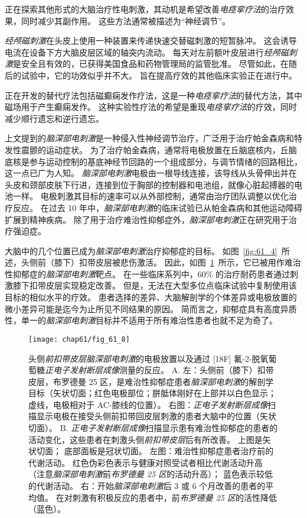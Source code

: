 正在探索其他形式的大脑治疗性电刺激，其动机是希望改善\textit{电痉挛疗法}的治疗效果，同时减少其副作用。
这些方法通常被描述为“神经调节”。


\textit{经颅磁刺激}在头皮上使用一种装置来传递快速交替磁刺激的短暂脉冲。
这会诱导电流在设备下方大脑皮层区域的轴突内流动。
每天对左前额叶皮层进行\textit{经颅磁刺激}是安全且有效的，已获得美国食品和药物管理局的监管批准。
尽管如此，在随后的试验中，它的功效似乎并不大。
旨在提高疗效的其他临床实验正在进行中。


正在开发的替代疗法包括磁癫痫发作疗法，这是一种\textit{电痉挛疗法}的替代方法，其中磁场用于产生癫痫发作。
这种实验性疗法的希望是重现\textit{电痉挛疗法}的疗效，同时减少顺行遗忘和逆行遗忘。


上文提到的\textit{脑深部电刺激}是一种侵入性神经调节治疗，广泛用于治疗帕金森病和特发性震颤的运动症状。
为了治疗帕金森病，通常将电极放置在丘脑底核内，丘脑底核是参与运动控制的基底神经节回路的一个组成部分，与调节情绪的回路相比，这一点已广为人知。
\textit{脑深部电刺激}电极由一根导线连接，该导线从头骨伸出并在头皮和颈部皮肤下行进，连接到位于胸部的控制器和电池组，就像心脏起搏器的电池一样。
电极刺激其目标的速率可以从外部控制，通常由治疗团队调整以优化治疗反应。
在过去 10 年中，\textit{脑深部电刺激}的临床试验已从帕金森病和其他运动障碍扩展到精神疾病。
除了用于治疗难治性抑郁症外，\textit{脑深部电刺激}正在研究用于治疗强迫症。


大脑中的几个位置已成为\textit{脑深部电刺激}治疗抑郁症的目标。
如图~\ref{fig:61_4}~所述，头侧前（膝下）扣带皮层被悲伤激活。
因此，如图~\ref{fig:61_8}~所示，它已被用作难治性抑郁症的\textit{脑深部电刺激}靶点。
在一些临床系列中，60\% 的治疗耐药患者通过刺激膝下扣带皮层实现稳定改善。
但是，无法在大型多位点临床试验中复制使用该目标的相似水平的疗效。
患者选择的差异、大脑解剖学的个体差异或电极放置的微小差异可能是迄今为止所见不同结果的原因。
简而言之，抑郁症具有高度异质性，单一的\textit{脑深部电刺激}目标并不适用于所有难治性患者也就不足为奇了。


\begin{figure}[htbp]
	\centering
	\texttt{[image: chap61/fig\_61\_8]}
	\caption{头侧\textit{前扣带皮层}\textit{脑深部电刺激}的电极放置以及通过 [18F] 氟-2-脱氧葡萄糖\textit{正电子发射断层成像}测量的反应。
		A. 左：头侧前（膝下）扣带皮层，布罗德曼 25 区，是难治性抑郁症患者\textit{脑深部电刺激}的解剖学目标（矢状切面；红色电极部位；胼胝体刚好在上部并以白色显示；虚线，电极相对于 AC-膝线的位置）。
		右图：\textit{正电子发射断层成像}扫描显示电极在接受头侧前扣带回皮层刺激的患者大脑中的位置（矢状切面）。
		B. \textit{正电子发射断层成像}扫描显示患有难治性抑郁症的患者的活动变化，这些患者在刺激头侧\textit{前扣带皮层}后有所改善。
		上图是矢状切面；
		底部面板是冠状切面。
		左图：难治性抑郁症患者治疗前的代谢活动。
		红色伪彩色表示与健康对照受试者相比代谢活动升高（注意\textit{脑深部电刺激}前\textit{布罗德曼 25 区}的活动升高）；
		蓝色表示较低的代谢活动。
		右：开始\textit{脑深部电刺激}后 3 或 6 个月改善的患者的平均值。
		在对刺激有积极反应的患者中，前\textit{布罗德曼 25 区}的活性降低（蓝色）。}
	\label{fig:61_8}
\end{figure}


